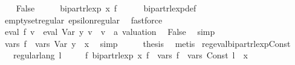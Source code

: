 \begin{isabellebody}
\ \ \isamarkupfalse%
\ False\isanewline
\ \ \isamarkupfalse%
\ \isamarkupfalse%
\ {\isachardoublequoteopen}bipart{\isacharunderscore}{\kern0pt}rlexp\ x\ {\isacharquery}{\kern0pt}f{\isacharprime}{\kern0pt}{\isachardoublequoteclose}\isanewline
\ \ \ \ \isamarkupfalse%
\ bipart{\isacharunderscore}{\kern0pt}rlexp{\isacharunderscore}{\kern0pt}def\ \isamarkupfalse%
\ emptyset{\isacharunderscore}{\kern0pt}regular\ epsilon{\isacharunderscore}{\kern0pt}regular\ \isamarkupfalse%
\ fastforce\isanewline
\ \ \isamarkupfalse%
\ \isamarkupfalse%
\ {\isachardoublequoteopen}eval\ {\isacharquery}{\kern0pt}f{\isacharprime}{\kern0pt}\ v\ {\isacharequal}{\kern0pt}\ eval\ {\isacharparenleft}{\kern0pt}Var\ y{\isacharparenright}{\kern0pt}\ v{\isachardoublequoteclose}\ \ v\ {\isacharcolon}{\kern0pt}{\isacharcolon}{\kern0pt}\ {\isachardoublequoteopen}{\isacharprime}{\kern0pt}a\ valuation{\isachardoublequoteclose}\ \isamarkupfalse%
\ False\ \isamarkupfalse%
\ simp\isanewline
\ \ \isamarkupfalse%
\ \isamarkupfalse%
\ {\isachardoublequoteopen}vars\ {\isacharquery}{\kern0pt}f{\isacharprime}{\kern0pt}\ {\isacharequal}{\kern0pt}\ vars\ {\isacharparenleft}{\kern0pt}Var\ y{\isacharparenright}{\kern0pt}\ {\isasymunion}\ {\isacharbraceleft}{\kern0pt}x{\isacharbraceright}{\kern0pt}{\isachardoublequoteclose}\ \isamarkupfalse%
\ simp\isanewline
\ \ \isamarkupfalse%
\ \isamarkupfalse%
\ {\isacharquery}{\kern0pt}thesis\ \isamarkupfalse%
\ metis\isanewline
{}\isamarkupfalse%
%
\endisatagproof
{\isafoldproof}%
%
\isadelimproof
\isanewline
%
\endisadelimproof
\isanewline
{}\isamarkupfalse%
\ reg{\isacharunderscore}{\kern0pt}eval{\isacharunderscore}{\kern0pt}bipart{\isacharunderscore}{\kern0pt}rlexp{\isacharunderscore}{\kern0pt}Const{\isacharcolon}{\kern0pt}\isanewline
\ \ \ {\isachardoublequoteopen}regular{\isacharunderscore}{\kern0pt}lang\ l{\isachardoublequoteclose}\isanewline
\ \ \ \ \ {\isachardoublequoteopen}{\isasymexists}f{\isacharprime}{\kern0pt}{\isachardot}{\kern0pt}\ bipart{\isacharunderscore}{\kern0pt}rlexp\ x\ f{\isacharprime}{\kern0pt}\ {\isasymand}\ vars\ f{\isacharprime}{\kern0pt}\ {\isacharequal}{\kern0pt}\ vars\ {\isacharparenleft}{\kern0pt}Const\ l{\isacharparenright}{\kern0pt}\ {\isasymunion}\ {\isacharbraceleft}{\kern0pt}x{\isacharbraceright}{\kern0pt}\isanewline

\end{isabellebody}
